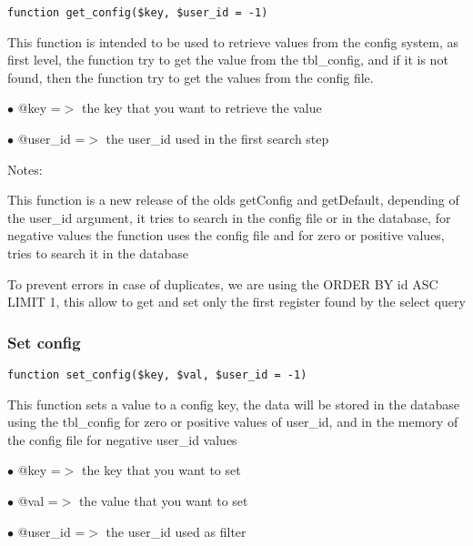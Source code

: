 \documentclass[a4paper]{article}
\begin{document}
\begin{lstlisting}
function get_config($key, $user_id = -1)
\end{lstlisting}

This function is intended to be used to retrieve values from the config
system, as first level, the function try to get the value from the
tbl\_config, and if it is not found, then the function try to get the
values from the config file.

\begin{compactitem}
\item[\color{myblue}$\bullet$] @key     =$>$ the key that you want to retrieve the value
\item[\color{myblue}$\bullet$] @user\_id =$>$ the user\_id used in the first search step
\end{compactitem}

Notes:

This function is a new release of the olds getConfig and getDefault,
depending of the user\_id argument, it tries to search in the config file or
in the database, for negative values the function uses the config file and
for zero or positive values, tries to search it in the database

To prevent errors in case of duplicates, we are using the ORDER BY id ASC
LIMIT 1, this allow to get and set only the first register found by the
select query

\hypertarget{toc79}{}
\subsubsection{Set config}

\begin{lstlisting}
function set_config($key, $val, $user_id = -1)
\end{lstlisting}

This function sets a value to a config key, the data will be stored in the
database using the tbl\_config for zero or positive values of user\_id, and
in the memory of the config file for negative user\_id values

\begin{compactitem}
\item[\color{myblue}$\bullet$] @key     =$>$ the key that you want to set
\item[\color{myblue}$\bullet$] @val     =$>$ the value that you want to set
\item[\color{myblue}$\bullet$] @user\_id =$>$ the user\_id used as filter
\end{compactitem}
\end{document}
